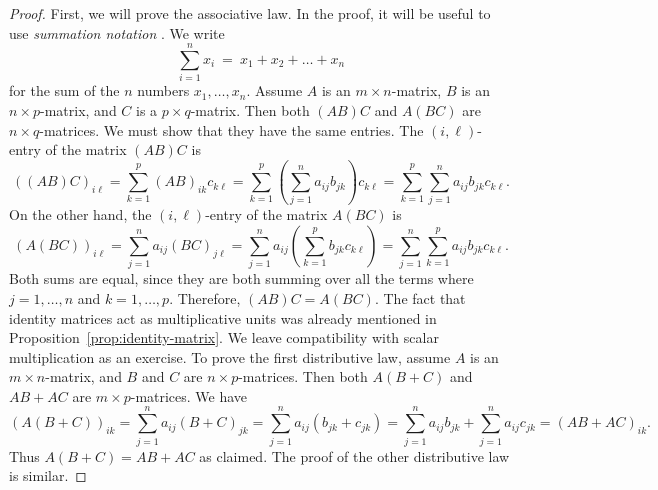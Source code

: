\begin{proof}
  First, we will prove the associative law. In the proof, it will be
  useful to use {\em summation notation}%
  .  We write
  \begin{equation*}
    \sum_{i=1}^n x_i ~=~ x_1 + x_2 + \ldots + x_n
  \end{equation*}
  for the sum of the $n$ numbers $x_1,\ldots,x_n$. Assume $A$ is an
  $m\times n$-matrix, $B$ is an $n\times p$-matrix, and $C$ is a
  $p\times q$-matrix. Then both $(AB)C$ and $A(BC)$ are
  $n\times q$-matrices. We must show that they have the same
  entries. The $(i,\ell)$-entry of the matrix $(AB)C$ is
  \begin{equation*}
    ((AB)C)_{i\ell} = \sum_{k=1}^p (AB)_{ik}c_{k\ell}
    = \sum_{k=1}^p (\sum_{j=1}^n a_{ij}b_{jk})c_{k\ell}
    = \sum_{k=1}^p\sum_{j=1}^n a_{ij}b_{jk}c_{k\ell}.
  \end{equation*}
  On the other hand, the $(i,\ell)$-entry of the matrix $A(BC)$ is
  \begin{equation*}
    (A(BC))_{i\ell} = \sum_{j=1}^n a_{ij}(BC)_{j\ell}
    = \sum_{j=1}^n a_{ij} (\sum_{k=1}^p b_{jk} c_{k\ell})
    = \sum_{j=1}^n\sum_{k=1}^p a_{ij} b_{jk} c_{k\ell}.
  \end{equation*}
  Both sums are equal, since they are both summing over all the terms
  where $j=1,\ldots,n$ and $k=1,\ldots,p$. Therefore, $(AB)C=A(BC)$.
  The fact that identity matrices act as multiplicative units was
  already mentioned in Proposition~\ref{prop:identity-matrix}.  We
  leave compatibility with scalar multiplication as an exercise.
  To prove the first distributive law, assume $A$ is an
  $m\times n$-matrix, and $B$ and $C$ are $n\times p$-matrices. Then
  both $A(B+C)$ and $AB+AC$ are $m\times p$-matrices. We have
  \begin{equation*}
    (A(B+C))_{ik} = \sum_{j=1}^n a_{ij}(B+C)_{jk}
    = \sum_{j=1}^n a_{ij}(b_{jk}+c_{jk})
    = \sum_{j=1}^n a_{ij}b_{jk} + \sum_{j=1}^n a_{ij}c_{jk}
    = (AB+AC)_{ik}.
  \end{equation*}
  Thus $A(B+C) =AB+AC$ as claimed. The proof of the other distributive
  law is similar.
\end{proof}
